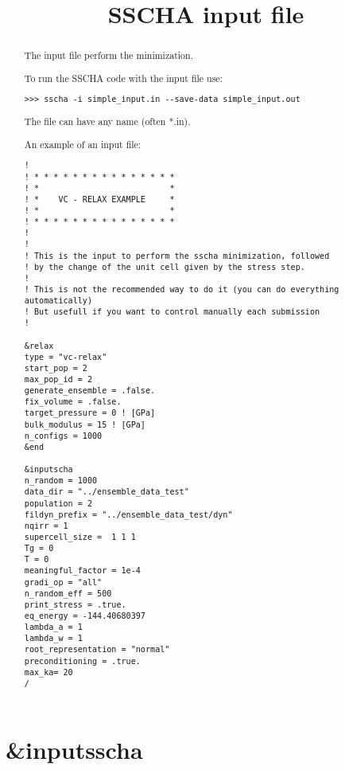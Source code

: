 \documentclass[]{scrartcl}
\title{SSCHA input file}
\author{}
\begin{document}
\maketitle

\begin{abstract}
The input file perform the minimization. 

To run the SSCHA code with the input file use:
\begin{verbatim}
>>> sscha -i simple_input.in --save-data simple_input.out
\end{verbatim}
The file can have any name (often *.in).

An example of an input file:
\begin{verbatim}
!
! * * * * * * * * * * * * * * *
! *                           *
! *    VC - RELAX EXAMPLE     *
! *                           *
! * * * * * * * * * * * * * * *
!
!
! This is the input to perform the sscha minimization, followed
! by the change of the unit cell given by the stress step.
!
! This is not the recommended way to do it (you can do everything automatically)
! But usefull if you want to control manually each submission
!

&relax
type = "vc-relax"
start_pop = 2
max_pop_id = 2
generate_ensemble = .false.
fix_volume = .false.
target_pressure = 0 ! [GPa]
bulk_modulus = 15 ! [GPa]
n_configs = 1000
&end

&inputscha
n_random = 1000
data_dir = "../ensemble_data_test"
population = 2
fildyn_prefix = "../ensemble_data_test/dyn"
nqirr = 1
supercell_size =  1 1 1
Tg = 0 
T = 0
meaningful_factor = 1e-4
gradi_op = "all" 
n_random_eff = 500
print_stress = .true.
eq_energy = -144.40680397
lambda_a = 1
lambda_w = 1
root_representation = "normal"
preconditioning = .true.
max_ka= 20
/
\end{verbatim}

\end{abstract}

\section{\&inputsscha}
\end{document}
